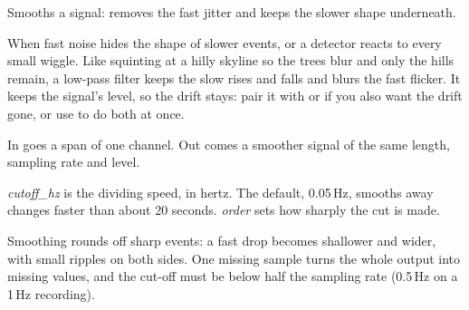 Smooths a signal: removes the fast jitter and keeps the slower shape underneath.

When fast noise hides the shape of slower events, or a detector reacts to every small wiggle.
Like squinting at a hilly skyline so the trees blur and only the hills remain, a low-pass
filter keeps the slow rises and falls and blurs the fast flicker. It keeps the signal's level,
so the drift stays: pair it with  or
 if you also want the drift gone, or use
 to do both at once.

In goes a span of one channel. Out comes a smoother signal of the same length, sampling rate
and level.

\emph{cutoff\_hz} is the dividing speed, in hertz. The default, 0.05\,Hz, smooths away
changes faster than about 20 seconds. \emph{order} sets how sharply the cut is made.

Smoothing rounds off sharp events: a fast drop becomes shallower and wider, with small ripples
on both sides. One missing sample turns the whole output into missing values, and the cut-off
must be below half the sampling rate (0.5\,Hz on a 1\,Hz recording).
